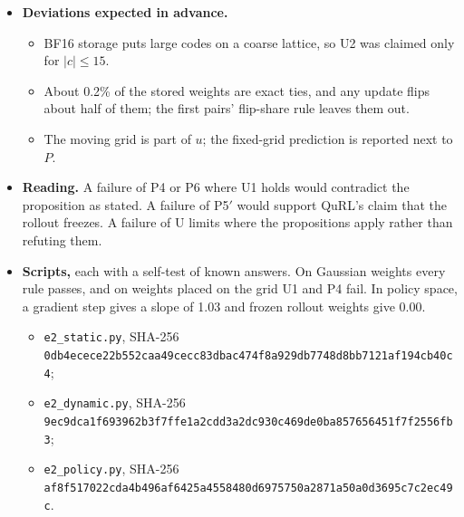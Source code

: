 \begin{itemize}[leftmargin=*,itemsep=2pt]
\item \textbf{Deviations expected in advance.}
  \begin{itemize}[leftmargin=*,itemsep=1pt]
  \item BF16 storage puts large codes on a coarse lattice, so U2 was claimed only for $|c|\le15$.
  \item About 0.2\% of the stored weights are exact ties, and any update flips about half of them; the first pairs' flip-share rule leaves them out.
  \item The moving grid is part of $u$; the fixed-grid prediction is reported next to $P$.
  \end{itemize}
\item \textbf{Reading.} A failure of P4 or P6 where U1 holds would contradict the proposition as stated. A failure of P5$'$ would support QuRL's claim that the rollout freezes. A failure of U limits where the propositions apply rather than refuting them.
\item \textbf{Scripts,} each with a self-test of known answers. On Gaussian weights every rule passes, and on weights placed on the grid U1 and P4 fail. In policy space, a gradient step gives a slope of 1.03 and frozen rollout weights give 0.00.
  \begin{itemize}[leftmargin=*,itemsep=1pt]
  \item \texttt{e2\_static.py}, SHA-256 \nolinkurl{0db4ecece22b552caa49cecc83dbac474f8a929db7748d8bb7121af194cb40c4};
  \item \texttt{e2\_dynamic.py}, SHA-256 \nolinkurl{9ec9dca1f693962b3f7ffe1a2cdd3a2dc930c469de0ba857656451f7f2556fb3};
  \item \texttt{e2\_policy.py}, SHA-256 \nolinkurl{af8f517022cda4b496af6425a4558480d6975750a2871a50a0d3695c7c2ec49c}.
  \end{itemize}
\end{itemize}


